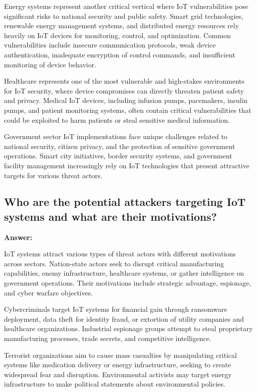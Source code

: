 \documentclass[12pt,a4paper]{article}
\begin{document}
Energy systems represent another critical vertical where IoT vulnerabilities pose significant risks to national security and public safety. Smart grid technologies, renewable energy management systems, and distributed energy resources rely heavily on IoT devices for monitoring, control, and optimization. Common vulnerabilities include insecure communication protocols, weak device authentication, inadequate encryption of control commands, and insufficient monitoring of device behavior.

Healthcare represents one of the most vulnerable and high-stakes environments for IoT security, where device compromises can directly threaten patient safety and privacy. Medical IoT devices, including infusion pumps, pacemakers, insulin pumps, and patient monitoring systems, often contain critical vulnerabilities that could be exploited to harm patients or steal sensitive medical information.

Government sector IoT implementations face unique challenges related to national security, citizen privacy, and the protection of sensitive government operations. Smart city initiatives, border security systems, and government facility management increasingly rely on IoT technologies that present attractive targets for various threat actors.

\subsection{Who are the potential attackers targeting IoT systems and what are their motivations?}

\textbf{Answer:}

IoT systems attract various types of threat actors with different motivations across sectors. Nation-state actors seek to disrupt critical manufacturing capabilities, enemy infrastructure, healthcare systems, or gather intelligence on government operations. Their motivations include strategic advantage, espionage, and cyber warfare objectives.

Cybercriminals target IoT systems for financial gain through ransomware deployment, data theft for identity fraud, or extortion of utility companies and healthcare organizations. Industrial espionage groups attempt to steal proprietary manufacturing processes, trade secrets, and competitive intelligence.

Terrorist organizations aim to cause mass casualties by manipulating critical systems like medication delivery or energy infrastructure, seeking to create widespread fear and disruption. Environmental activists may target energy infrastructure to make political statements about environmental policies.
\end{document}
